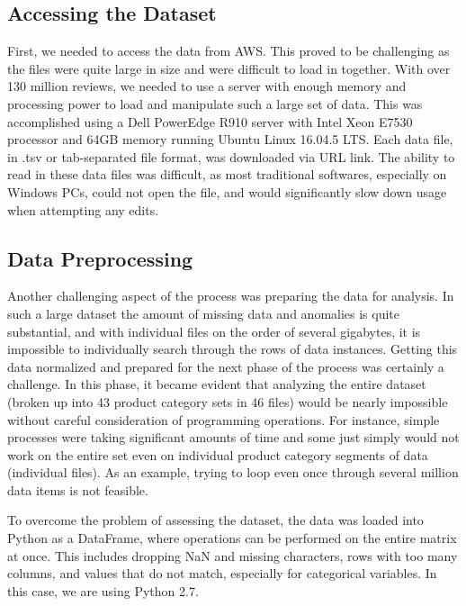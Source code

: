 \documentclass[10pt, conference, compsocconf]{IEEEtran}
\begin{document}
\subsection{Accessing the Dataset}

First, we needed to access the data from AWS. This proved to be challenging as the files were quite large in size and were difficult to load in together. With over 130 million reviews, we needed to use a server with enough memory and processing power to load and manipulate such a large set of data. This was accomplished using a Dell PowerEdge R910 server with Intel Xeon E7530 processor and 64GB memory running Ubuntu Linux 16.04.5 LTS. Each data file, in .tsv or tab-separated file format, was downloaded via URL link. The ability to read in these data files was difficult, as most traditional softwares, especially on Windows PCs, could not open the file, and would significantly slow down usage when attempting any edits.

\subsection{Data Preprocessing}

Another challenging aspect of the process was preparing the data for analysis. In such a large dataset the amount of missing data and anomalies is quite substantial, and with individual files on the order of several gigabytes, it is impossible to individually search through the rows of data instances. Getting this data normalized and prepared for the next phase of the process was certainly a challenge. In this phase, it became evident that analyzing the entire dataset (broken up into 43 product category sets in 46 files) would be nearly impossible without careful consideration of programming operations. For instance, simple processes were taking significant amounts of time and some just simply would not work on the entire set even on individual product category segments of data (individual files). As an example, trying to loop even once through several million data items is not feasible. 

To overcome the problem of assessing the dataset, the data was loaded into Python as a DataFrame, where operations can be performed on the entire matrix at once. This includes dropping NaN and missing characters, rows with too many columns, and values that do not match, especially for categorical variables. In this case, we are using Python 2.7. 
\end{document}
